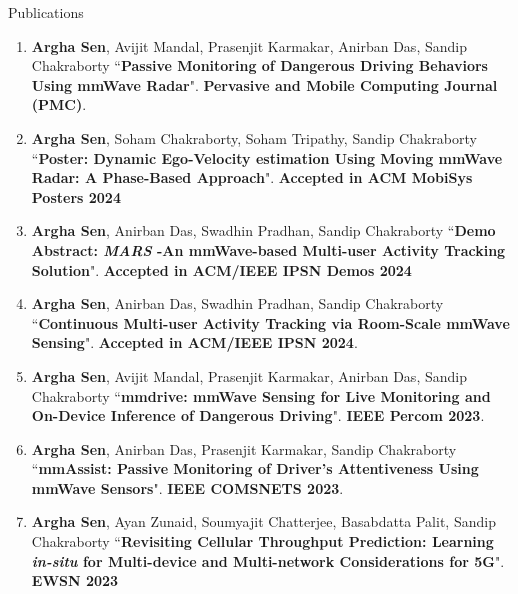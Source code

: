 \documentclass{resume} %
\begin{document}
\begin{rSection}{Publications}
\begin{enumerate}
			\item \textbf{Argha Sen}, Avijit Mandal, Prasenjit Karmakar, Anirban Das, Sandip Chakraborty ``\textbf{Passive Monitoring of Dangerous Driving Behaviors Using mmWave Radar}". \textbf{Pervasive and Mobile Computing Journal (PMC)}.
			
			\item \textbf{Argha Sen}, Soham Chakraborty, Soham Tripathy, Sandip Chakraborty ``\textbf{Poster: Dynamic Ego-Velocity estimation Using Moving mmWave Radar: A Phase-Based Approach}". \textbf{Accepted in ACM MobiSys Posters 2024}
			\item \textbf{Argha Sen}, Anirban Das, Swadhin Pradhan, Sandip Chakraborty ``\textbf{Demo Abstract: \textit{MARS} -An mmWave-based Multi-user Activity Tracking Solution}". \textbf{Accepted in ACM/IEEE IPSN Demos 2024}
			
			\item \textbf{Argha Sen}, Anirban Das, Swadhin Pradhan, Sandip Chakraborty ``\textbf{Continuous Multi-user Activity Tracking via Room-Scale mmWave Sensing}". \textbf{Accepted in ACM/IEEE IPSN 2024}.
			
			\item \textbf{Argha Sen}, Avijit Mandal, Prasenjit Karmakar, Anirban Das, Sandip Chakraborty ``\textbf{mmdrive: mmWave Sensing for Live Monitoring and On-Device Inference of Dangerous Driving}". \textbf{IEEE Percom 2023}.
			
			\item \textbf{Argha Sen}, Anirban Das, Prasenjit Karmakar, Sandip Chakraborty ``\textbf{mmAssist: Passive Monitoring of Driver's Attentiveness Using mmWave Sensors}". \textbf{IEEE COMSNETS 2023}.
			
			\item \textbf{Argha Sen}, Ayan Zunaid, Soumyajit Chatterjee, Basabdatta Palit, Sandip Chakraborty ``\textbf{Revisiting Cellular Throughput Prediction: Learning \textit{in-situ} for Multi-device and Multi-network Considerations for 5G}". \textbf{EWSN 2023}
			

\end{enumerate}
\end{rSection}
\end{document}
